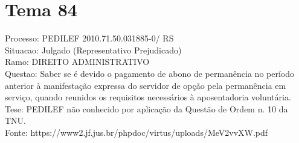 \documentclass[12pt]{article}
\begin{document}
\section*{Tema 84}
Processo: PEDILEF 2010.71.50.031885-0/ RS\\
Situacao: Julgado (Representativo Prejudicado)\\
Ramo: DIREITO ADMINISTRATIVO\\
Questao: Saber se é devido o pagamento de abono de permanência no período anterior à manifestação expressa do servidor de opção pela permanência em serviço, quando reunidos os requisitos necessários à aposentadoria voluntária.\\
Tese: PEDILEF não conhecido por aplicação da Questão de Ordem n. 10 da TNU.\\
Fonte: https://www2.jf.jus.br/phpdoc/virtus/uploads/MeV2vvXW.pdf
\end{document}
